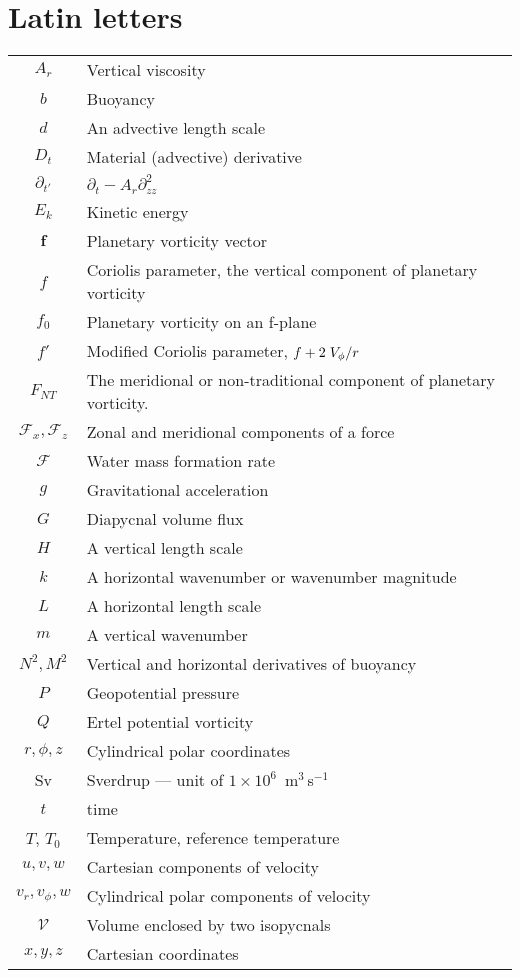 \section*{Latin letters}
\begin{longtable}{cp{\textwidth}}
    $A_r$ & Vertical viscosity \\
    $b$ & Buoyancy \\
    $d$ & An advective length scale \\
    $D_t$ & Material (advective) derivative \\
    $\partial_{t'}$ & $\partial_t - A_r \partial^2_{zz}$ \\
    $E_k$ & Kinetic energy \\
    $\mathbf{f}$ & Planetary vorticity vector \\
    $f$ & Coriolis parameter, the vertical component of planetary vorticity \\
    $f_0$ & Planetary vorticity on an f-plane \\
    $f'$ & Modified Coriolis parameter, $f + 2 \flatfrac{V_\phi}{r}$ \\
    $F_{NT}$ & The meridional or non-traditional component of planetary vorticity. \\
    $\mathcal{F}_x, \mathcal{F}_z$ & Zonal and meridional components of a force \\
    $\mathscr{F}$ & Water mass formation rate \\
    $g$ & Gravitational acceleration \\
    $G$ & Diapycnal volume flux \\
    $H$ & A vertical length scale \\
    $k$ & A horizontal wavenumber or wavenumber magnitude \\
    $L$ & A horizontal length scale \\
    $m$ & A vertical wavenumber \\
    $N^2, M^2$ & Vertical and horizontal derivatives of buoyancy \\
    $P$ & Geopotential pressure \\
    $Q$ & Ertel potential vorticity \\
    $r, \phi, z$ & Cylindrical polar coordinates \\
    Sv & Sverdrup --- unit of $1 \times 10^{6}$~m$^3$\,s$^{-1}$ \\
    $t$ & time \\
    $T$, $T_0$ & Temperature, reference temperature \\
    $u, v, w$ & Cartesian components of velocity \\
    $v_r, v_\phi, w$ & Cylindrical polar components of velocity \\
    $\mathcal{V}$ & Volume enclosed by two isopycnals \\
    $x, y, z$ & Cartesian coordinates \\
\end{longtable}
    
